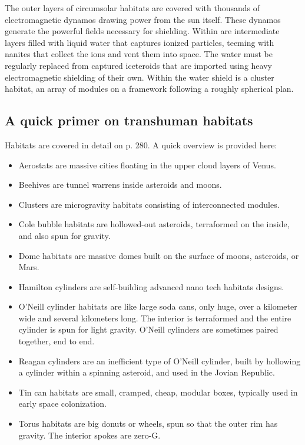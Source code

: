 The outer layers of circumsolar habitats are covered with thousands of electromagnetic dynamos drawing power from the sun itself. These dynamos generate the powerful fields necessary for shielding. Within are intermediate layers filled with liquid water that captures ionized particles, teeming with nanites that collect the ions and vent them into space. The water must be regularly replaced from captured iceteroids that are imported using heavy electromagnetic shielding of their own. Within the water shield is a cluster habitat, an array of modules on a framework following a roughly spherical plan. 

\subsection{A quick primer on transhuman habitats} \label{sec:quick-prim-transh} 

Habitats are covered in detail on p. 280. A quick overview is provided here: 

\begin{itemize} \item Aerostats are massive cities floating in the upper cloud layers of Venus. \item Beehives are tunnel warrens inside asteroids and moons. \item Clusters are microgravity habitats consisting of interconnected modules. \item Cole bubble habitats are hollowed-out asteroids, terraformed on the inside, and also spun for gravity. \item Dome habitats are massive domes built on the surface of moons, asteroids, or Mars. \item Hamilton cylinders are self-building advanced nano tech habitats designs. \item O'Neill cylinder habitats are like large soda cans, only huge, over a kilometer wide and several kilometers long. The interior is terraformed and the entire cylinder is spun for light gravity. O'Neill cylinders are sometimes paired together, end to end. \item Reagan cylinders are an inefficient type of O'Neill cylinder, built by hollowing a cylinder within a spinning asteroid, and used in the Jovian Republic. \item Tin can habitats are small, cramped, cheap, modular boxes, typically used in early space colonization. \item Torus habitats are big donuts or wheels, spun so that the outer rim has gravity. The interior spokes are zero-G. \end{itemize} 

